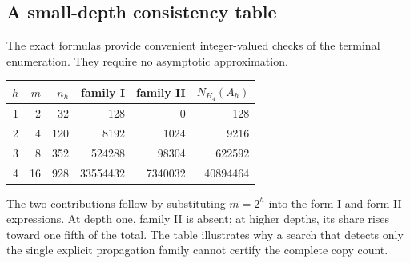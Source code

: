 \subsection{A small-depth consistency table}
The exact formulas provide convenient integer-valued checks of the
terminal enumeration. They require no asymptotic approximation.
\begin{center}\small
\begin{tabular}{r|r|r|r|r|r}
\toprule
$h$ & $m$ & $n_h$ & family I & family II & $N_{H_4}(A_h)$\\\midrule
1&2&32&128&0&128\\
2&4&120&8192&1024&9216\\
3&8&352&524288&98304&622592\\
4&16&928&33554432&7340032&40894464\\
\bottomrule
\end{tabular}
\end{center}
The two contributions follow by substituting $m=2^h$ into the
form-I and form-II expressions. At depth one, family II is absent;
at higher depths, its share rises toward one fifth of the total.
The table illustrates why a search that detects only the single
explicit propagation family cannot certify the complete copy count.
